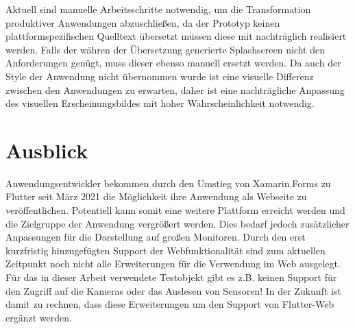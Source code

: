 Aktuell sind manuelle Arbeitsschritte notwendig,  um die Transformation produktiver Anwendungen  abzuschließen,  da der Prototyp keinen plattformspezifischen Quelltext übersetzt müssen diese mit nachträglich realisiert werden.  Falls der währen der Übersetzung generierte Splashscreen nicht den Anforderungen genügt,  muss dieser ebenso manuell ersetzt werden.  Da auch der Style der Anwendung nicht übernommen wurde ist eine visuelle Differenz zwischen den Anwendungen zu erwarten,  daher ist eine nachträgliche Anpassung des visuellen Erscheinungsbildes mit hoher Wahrscheinlichkeit notwendig. 


\section{Ausblick}
Anwendungsentwickler bekommen durch den Umstieg von Xamarin.Forms zu Flutter seit März 2021 die Möglichkeit ihre Anwendung als Webseite zu veröffentlichen.  Potentiell kann somit eine weitere Plattform erreicht werden und die Zielgruppe der Anwendung vergrößert werden.  Dies bedarf jedoch zusätzlicher Anpassungen für die Darstellung auf großen Monitoren.  Durch den erst kurzfristig hinzugefügten Support der Webfunktionalität sind zum aktuellen Zeitpunkt noch nicht alle Erweiterungen für die Verwendung im Web ausgelegt.  Für das in dieser Arbeit verwendete Testobjekt gibt es z.B.  keinen Support für den Zugriff auf die Kameras oder das Auslesen von Sensoren! In der Zukunft ist damit zu rechnen, dass diese Erweiterungen um den Support von Flutter-Web ergänzt werden.  